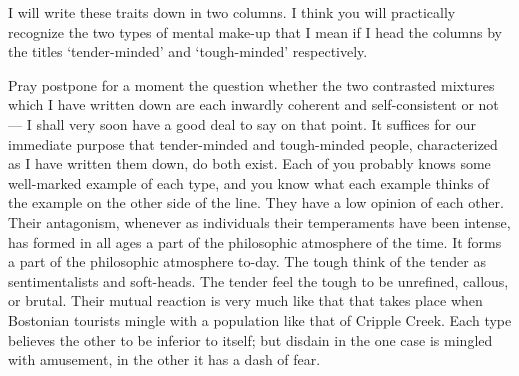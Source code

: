 \documentclass[]{article}
\begin{document}
I will write these traits down in two columns. I think you will
practically recognize the two types of mental make-up that I mean if
I head the columns by the titles `tender-minded' and `tough-minded'
respectively.

\bigskip

\noindent
{}\hfill
{}

\bigskip

Pray postpone for a moment the question whether the two contrasted
mixtures which I have written down are each inwardly coherent and
self-consistent or not--- I shall very soon have a good deal to say on
that point. It suffices for our immediate purpose that tender-minded and
tough-minded people, characterized as I have written them down, do both
exist. Each of you probably knows some well-marked example of each type,
and you know what each example thinks of the example on the other side
of the line. They have a low opinion of each other. Their antagonism,
whenever as individuals their temperaments have been intense, has formed
in all ages a part of the philosophic atmosphere of the time. It forms a
part of the philosophic atmosphere to-day. The tough think of the tender
as sentimentalists and soft-heads. The tender feel the tough to be
unrefined, callous, or brutal. Their mutual reaction is very much like
that that takes place when Bostonian tourists mingle with a population
like that of Cripple Creek. Each type believes the other to be inferior
to itself; but disdain in the one case is mingled with amusement, in the
other it has a dash of fear.
\end{document}
